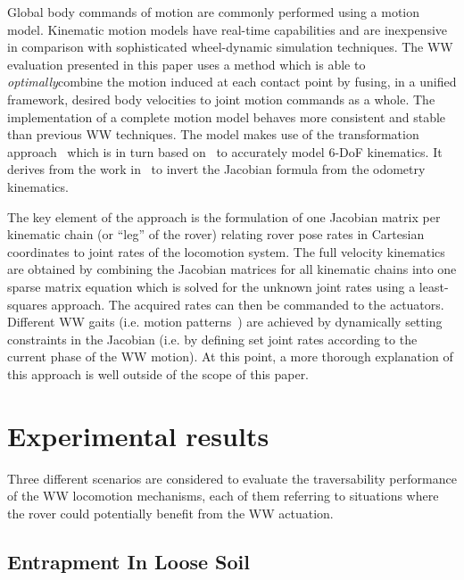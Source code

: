 \documentclass[a4paper,twocolumn]{esapub2005} %
\begin{document}
Global body commands of motion are commonly performed using a motion model.
Kinematic motion models have real-time capabilities and are inexpensive in
comparison with sophisticated wheel-dynamic simulation techniques.  The
WW evaluation presented in this paper uses a method which is able to
\textit{optimally}\footnotemark[2] combine the motion induced at each contact
point by fusing, in a unified framework, desired body velocities to joint 
motion commands as a whole.  The implementation of a complete motion model 
behaves more consistent and stable than previous WW techniques. The model makes 
use of the transformation approach~\cite{Tarokh2005} which is in turn based 
on~\cite{MuirNeumann1987} to accurately model 6-DoF kinematics. It derives from 
the work in~\cite{Hidalgo-Carrio2014} to invert the Jacobian formula from the 
odometry kinematics.

The key element of the approach is the formulation of one Jacobian matrix per 
kinematic chain (or ``leg'' of the rover) relating rover pose rates in 
Cartesian coordinates to joint rates of the locomotion system. The full 
velocity kinematics are obtained by combining the Jacobian 
matrices for all kinematic chains into one sparse matrix equation which is 
solved for the unknown joint rates using a least-squares approach. The 
acquired rates can then be commanded to the actuators. Different WW gaits (i.e. 
motion patterns~\cite{LucWalkingGaits}) are achieved by dynamically setting 
constraints in the Jacobian (i.e. by defining set joint rates according to the 
current phase of the WW motion). At this point, a more thorough explanation of this approach is well outside of the scope of this paper.


\section{Experimental results}

Three different scenarios are considered to evaluate the traversability
performance of the WW locomotion mechanisms, each of them referring
to situations where the rover could potentially benefit from the WW
actuation.

\subsection{Entrapment In Loose Soil} 
\end{document}
